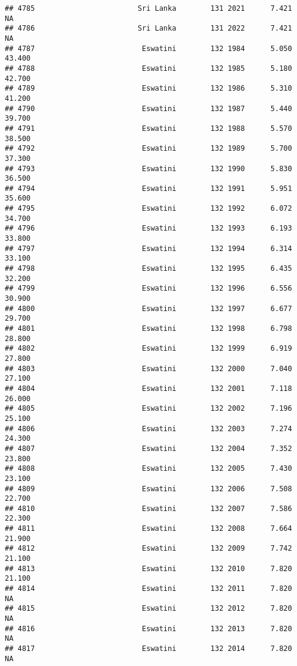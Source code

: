 \documentclass[
]{article}
\begin{document}
\begin{verbatim}
## 4785                        Sri Lanka        131 2021      7.421         NA
## 4786                        Sri Lanka        131 2022      7.421         NA
## 4787                         Eswatini        132 1984      5.050     43.400
## 4788                         Eswatini        132 1985      5.180     42.700
## 4789                         Eswatini        132 1986      5.310     41.200
## 4790                         Eswatini        132 1987      5.440     39.700
## 4791                         Eswatini        132 1988      5.570     38.500
## 4792                         Eswatini        132 1989      5.700     37.300
## 4793                         Eswatini        132 1990      5.830     36.500
## 4794                         Eswatini        132 1991      5.951     35.600
## 4795                         Eswatini        132 1992      6.072     34.700
## 4796                         Eswatini        132 1993      6.193     33.800
## 4797                         Eswatini        132 1994      6.314     33.100
## 4798                         Eswatini        132 1995      6.435     32.200
## 4799                         Eswatini        132 1996      6.556     30.900
## 4800                         Eswatini        132 1997      6.677     29.700
## 4801                         Eswatini        132 1998      6.798     28.800
## 4802                         Eswatini        132 1999      6.919     27.800
## 4803                         Eswatini        132 2000      7.040     27.100
## 4804                         Eswatini        132 2001      7.118     26.000
## 4805                         Eswatini        132 2002      7.196     25.100
## 4806                         Eswatini        132 2003      7.274     24.300
## 4807                         Eswatini        132 2004      7.352     23.800
## 4808                         Eswatini        132 2005      7.430     23.100
## 4809                         Eswatini        132 2006      7.508     22.700
## 4810                         Eswatini        132 2007      7.586     22.300
## 4811                         Eswatini        132 2008      7.664     21.900
## 4812                         Eswatini        132 2009      7.742     21.100
## 4813                         Eswatini        132 2010      7.820     21.100
## 4814                         Eswatini        132 2011      7.820         NA
## 4815                         Eswatini        132 2012      7.820         NA
## 4816                         Eswatini        132 2013      7.820         NA
## 4817                         Eswatini        132 2014      7.820         NA

\end{verbatim}
\end{document}
